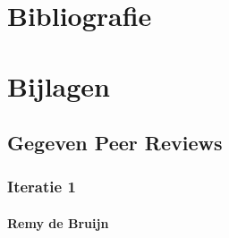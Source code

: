 \documentclass[a4paper]{report}
\begin{document}
\chapter{Bibliografie}
\begingroup



\endgroup

\chapter{Bijlagen}
\section{Gegeven Peer Reviews}
\subsection{Iteratie 1}
\subsubsection{Remy de Bruijn}
\noindent
\begin{minipage}{\textwidth}
  \centering
\end{minipage}
\end{document}
